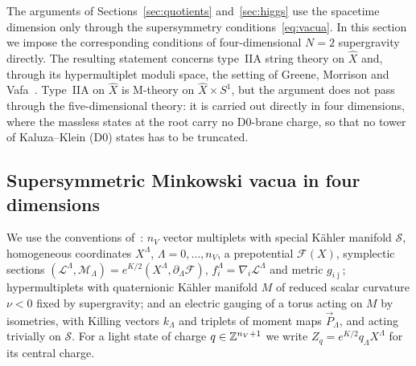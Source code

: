 The arguments of Sections~\ref{sec:quotients} and~\ref{sec:higgs} use the spacetime dimension only
through the supersymmetry conditions~\eqref{eq:vacua}. In this section we impose the corresponding
conditions of four-dimensional $N=2$ supergravity directly. The resulting statement concerns type~IIA
string theory on $\widehat X$ and, through its hypermultiplet moduli space, the setting of Greene,
Morrison and Vafa~\cite[Sect.~6]{Greene:1996Confinement}. Type~IIA on $\widehat X$ is M-theory on
$\widehat X\times S^1$, but the argument does not pass through the five-dimensional theory: it is carried
out directly in four dimensions, where the massless states at the root carry no D0-brane charge, so that
no tower of Kaluza--Klein (D0) states has to be truncated.

\subsection{Supersymmetric Minkowski vacua in four dimensions}
\label{subsec:4d-setting}

We use the conventions of~\cite{Andrianopoli:1996cm,Hristov:2009}: $n_V$ vector multiplets with special
K\"ahler manifold $\mathcal S$, homogeneous coordinates $X^\Lambda$, $\Lambda=0,\dots,n_V$, a prepotential
$\mathcal F(X)$, symplectic sections $(\mathcal L^\Lambda,\mathcal M_\Lambda)=e^{K/2}(X^\Lambda,\partial_\Lambda\mathcal F)$,
$f_i^\Lambda=\nabla_i\mathcal L^\Lambda$ and metric $g_{i\bar\jmath}$; hypermultiplets with quaternionic
K\"ahler manifold $M$ of reduced scalar curvature $\nu<0$ fixed by supergravity; and an electric gauging of
a torus acting on $M$ by isometries, with Killing vectors $k_\Lambda$ and triplets of moment maps
$\vec P_\Lambda$, and acting trivially on $\mathcal S$. For a light state of charge $q\in\mathbb Z^{n_V+1}$ we write
$Z_q=e^{K/2}q_\Lambda X^\Lambda$ for its central charge.

